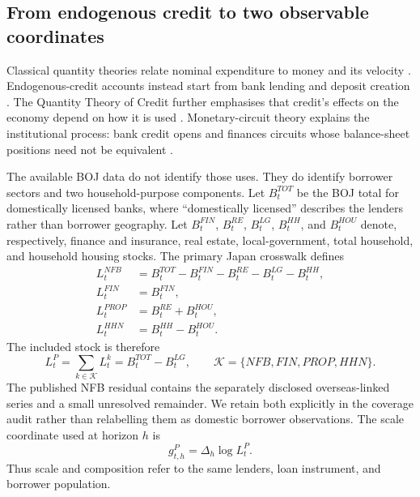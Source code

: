 \documentclass[11pt]{article}
\begin{document}
\subsection{From endogenous credit to two observable coordinates}

Classical quantity theories relate nominal expenditure to money and its
velocity \citep{Fisher1911,Friedman1956,Laidler1985}. Endogenous-credit accounts
instead start from bank lending and deposit creation
\citep{LeBourva1992,Fontana2003,BoE2014}. The Quantity Theory of Credit further
emphasises that credit's effects on the economy depend on how it is used
\citep{Werner2012}. Monetary-circuit theory explains the institutional process:
bank credit opens and finances circuits whose balance-sheet positions need not
be equivalent \citep{RochonRossi2007,Passarella2014}.

The available BOJ data do not identify those uses. They do identify borrower
sectors and two household-purpose components. Let \(B_t^{TOT}\) be the BOJ
total for domestically licensed banks, where ``domestically licensed''
describes the lenders rather than borrower geography. Let \(B_t^{FIN}\),
\(B_t^{RE}\), \(B_t^{LG}\), \(B_t^{HH}\), and \(B_t^{HOU}\) denote,
respectively, finance and insurance, real estate, local-government, total
household, and household housing stocks. The primary Japan crosswalk defines
\begin{align}
 L_t^{NFB}
   &=B_t^{TOT}-B_t^{FIN}-B_t^{RE}-B_t^{LG}-B_t^{HH}, \\
 L_t^{FIN}&=B_t^{FIN}, \\
 L_t^{PROP}&=B_t^{RE}+B_t^{HOU}, \\
 L_t^{HHN}&=B_t^{HH}-B_t^{HOU}.
 \label{eq:primary_crosswalk}
\end{align}
The included stock is therefore
\begin{equation}
 L_t^P=\sum_{k\in\mathcal K}L_t^k=B_t^{TOT}-B_t^{LG},
 \qquad
 \mathcal K=\{NFB,FIN,PROP,HHN\}.
 \label{eq:included_stock}
\end{equation}
The published NFB residual contains the separately disclosed overseas-linked
series and a small unresolved remainder. We retain both explicitly in the
coverage audit rather than relabelling them as domestic borrower observations.
The scale coordinate used at horizon \(h\) is
\begin{equation}
  g_{t,h}^P=\Delta_h\log L_t^P.
  \label{eq:mapped_scale}
\end{equation}
Thus scale and composition refer to the same lenders, loan instrument, and
borrower population.
\end{document}
